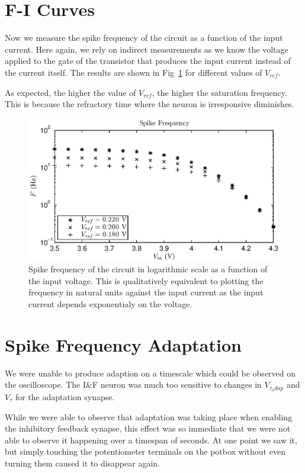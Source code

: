 \section{F-I Curves}
Now we measure the spike frequency of the circuit as a function of the input current. Here again, we rely on indirect measurements as we know the voltage applied to the gate of the transistor that produces the input current instead of the current itself. The results are shown in Fig~\ref{fig:exp1b} for different values of $V_{ref}$.

As expected, the higher the value of $V_{ref}$, the higher the saturation frequency. This is because the refractory time where the neuron is irresponsive diminishes. \\

\begin{figure}[!h]
	\center
	\includegraphics{exp1b.eps}
	\caption{Spike frequency of the circuit in logarithmic scale as a function of the input voltage. This is qualitatively equivalent to plotting the frequency in natural units against the input current as the input current depends exponentialy on the voltage.}
	\label{fig:exp1b}
\end{figure}


\section{Spike Frequency Adaptation}
We were unable to produce adaption on a timescale which could be observed on the oscilloscope. The I\&F neuron was much too sensitive to 
changes in \(V_{\tau_adap}\) and \(V_{\tau}\) for the adaptation synapse. 

While we were able to observe that adaptation was taking place when enabling the inhibitory feedback synapse, this effect was so immediate
that we were not able to observe it happening over a timespan of seconds. At one point we saw it, but simply touching the potentiometer
terminals on the potbox without even turning them caused it to disappear again.


